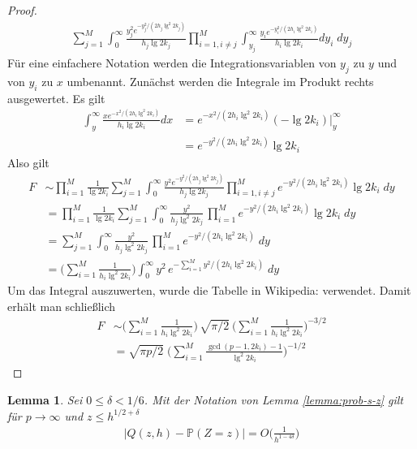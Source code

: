 \documentclass[a4paper, 11pt, ngerman]{article}
\renewcommand{\P}{\mathbb{P}}
\theoremstyle{definition}
\theoremstyle{plain}
\newtheorem{lemma}{Lemma}
\theoremstyle{remark}
\begin{document}
\begin{proof}
\begin{align*}
        \sum_{j = 1}^M \int_0^\infty
        \frac {y_j^2 e^{-y_j^2 / (2h_j \lg^2 2k_j)}} {h_j \lg 2k_j}
        \prod_{i = 1, i \ne j}^M \int_{y_j}^{\infty}
        \frac {y_i e^{-y_i^2 / (2h_i \lg^2 2k_i)}} {h_i \lg 2k_i} dy_i \; dy_j
    \end{align*}
    Für eine einfachere Notation werden die Integrationsvariablen von $y_j$ zu $y$ und von $y_i$ zu $x$ umbenannt. Zunächst werden die Integrale im Produkt rechts ausgewertet. Es gilt
    \begin{align*}
        \int_{y}^{\infty}
        \frac {x e^{-x^2 / (2h_i \lg^2 2k_i)}} {h_i \lg 2k_i} dx
         & = e^{-x^2/(2h_i \lg^2 2k_i)} (- \lg 2k_i) \Big \vert_{y}^{\infty} \\
         & = e^{-y^2/(2h_i \lg^2 2k_i)} \lg 2k_i
    \end{align*}
    Also gilt
    \begin{align*}
        F & \sim
        \prod_{i = 1}^M \frac 1 {\lg 2k_i}
        \sum_{j = 1}^M \int_0^\infty
        \frac {y^2 e^{-y^2 / (2h_j \lg^2 2k_j)}} {h_j \lg 2k_j}
        \prod_{i = 1, i \ne j}^M e^{-y^2/(2h_i \lg^2 2k_i)} \lg 2k_i \; dy \\
          & = \prod_{i = 1}^M \frac 1 {\lg 2k_i}
        \sum_{j = 1}^M \int_0^\infty
        \frac {y^2} {h_j \lg^2 2k_j} \,
        \prod_{i = 1}^M e^{-y^2/(2h_i \lg^2 2k_i)} \lg 2k_i \; dy          \\
          & = \sum_{j = 1}^M \int_0^\infty
        \frac {y^2} {h_j \lg^2 2k_j} \,
        \prod_{i = 1}^M e^{-y^2/(2h_i \lg^2 2k_i)} \; dy                   \\
          & = \Bigg ( \sum_{i = 1}^M \frac 1 {h_i \lg^2 2k_i} \Bigg )
        \int_0^\infty
        y^2 \,e^{- \sum_{i = 1}^M y^2/(2h_i \lg^2 2k_i)} \; dy
    \end{align*}
    Um das Integral auszuwerten, wurde die Tabelle in Wikipedia: \cite{gint} verwendet. Damit erhält man schließlich
    \begin{align*}
        F & \sim \Bigg (\sum_{i = 1}^M \frac 1 {h_i \lg^2 2k_i} \Bigg ) \,
        \sqrt {\pi / 2} \
        \Bigg ( \sum_{i = 1}^M \frac 1 {h_i \lg^2 2k_i} \Bigg )^{-3/2}     \\
          & = \sqrt{\pi p / 2} \; \Bigg (
        \sum_{i = 1}^M \frac {\gcd(p - 1, 2k_i) - 1} {\lg^2 2k_i} \Bigg )^{-1/2}
    \end{align*}
\end{proof}

\begin{lemma}
    Sei $0 \le \delta < 1/6$. Mit der Notation von Lemma \ref{lemma:prob-s-z} gilt für $p \to \infty$ und $z \le h^{1/2 + \delta}$
    \begin{align*}
        |Q(z, h) - \P(Z = z)| = O \bigg ( \frac 1 {h^{1 - 4\delta}} \bigg )
    \end{align*}

    \label{lemma:prob-s-z-asmyp}
\end{lemma}
\end{document}
